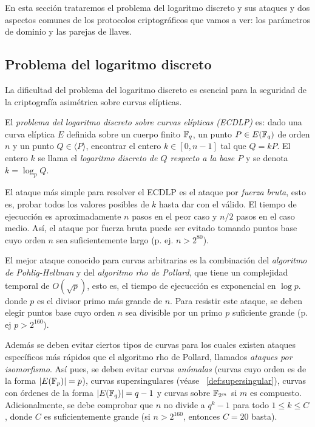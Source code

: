 En esta sección trataremos el problema del logaritmo discreto y sus ataques y dos aspectos comunes de los protocolos criptográficos que vamos a ver: los parámetros de dominio y las parejas de llaves.

\subsection{Problema del logaritmo discreto}
\label{sub:Problema del logaritmo discreto}

La dificultad del problema del logaritmo discreto es esencial para la seguridad de la criptografía asimétrica sobre curvas elípticas.

\begin{definicion}
    El \emph{problema del logaritmo discreto sobre curvas elípticas (ECDLP)} es: dado una curva elíptica $E$ definida sobre un cuerpo finito $\mathbb{F}_q$, un punto $P \in E(\mathbb{F}_q)$ de orden $n$ y un punto $Q \in \langle P \rangle$, encontrar el entero $k \in [0, n - 1]$ tal que $Q = k P$. El entero $k$ se llama el \emph{logaritmo discreto de $Q$ respecto a la base $P$} y se denota $k = \log_p Q$.
\end{definicion}

El ataque más simple para resolver el ECDLP es el ataque por \emph{fuerza bruta}, esto es, probar todos los valores posibles de $k$ hasta dar con el válido. El tiempo de ejecucción es aproximadamente $n$ pasos en el peor caso y $n / 2$ pasos en el caso medio. Así, el ataque por fuerza bruta puede ser evitado tomando puntos base cuyo orden $n$ sea suficientemente largo (p. ej. $n > 2^{80}$).

El mejor ataque conocido para curvas arbitrarias es la combinación del \emph{algoritmo de Pohlig-Hellman} y del \emph{algoritmo rho de Pollard}, que tiene un complejidad temporal de $O(\sqrt{p})$, esto es, el tiempo de ejecucción es exponencial en $\log{p}$. donde $p$ es el divisor primo más grande de $n$. Para resistir este ataque, se deben elegir puntos base cuyo orden $n$ sea divisible por un primo $p$ suficiente grande (p. ej $p > 2^{160}$).

Además se deben evitar ciertos tipos de curvas para los cuales existen ataques específicos más rápidos que el algoritmo rho de Pollard, llamados \emph{ataques por isomorfismo}. Así pues, se deben evitar curvas \emph{anómalas} (curvas cuyo orden es de la forma $|E(\mathbb{F}_p)| = p$), curvas supersingulares (véase ~\ref{def:supersingular}), curvas con órdenes de la forma $|E(\mathbb{F}_q)| = q - 1$ y curvas sobre $\mathbb{F}_{2^m}$ si $m$ es compuesto. Adicionalmente, se debe comprobar que $n$ no divide a $q^k - 1$ para todo $1 \le k \le C$, donde $C$ es suficientemente grande (si $n > 2^{160}$, entonces $C = 20$ basta).

